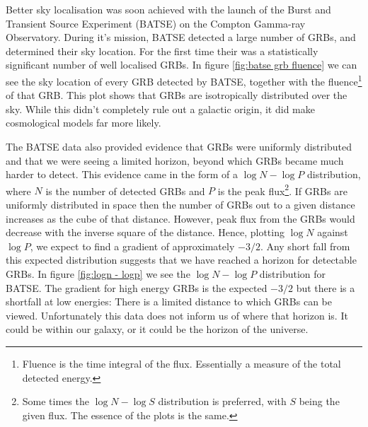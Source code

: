 \documentclass[11pt]{cuthesis}
\begin{document}
Better sky localisation was soon achieved with the launch of the Burst and Transient Source Experiment (BATSE) on the Compton Gamma-ray Observatory. During it's mission, BATSE detected a large number of GRBs, and determined their sky location. For the first time their was a statistically significant number of well localised GRBs. In figure \ref{fig:batse grb fluence} we can see the sky location of every GRB detected by BATSE, together with the fluence\footnote{Fluence is the time integral of the flux. Essentially a measure of the total detected energy.} of that GRB. This plot shows that GRBs are isotropically distributed over the sky. While this didn't completely rule out a galactic origin, it did make cosmological models far more likely. 

The BATSE data also provided evidence that GRBs were uniformly distributed and that we were seeing a limited horizon, beyond which GRBs became much harder to detect. This evidence came in the form of a $\log N - \log P$ distribution, where $N$ is the number of detected GRBs and $P$ is the peak flux\footnote{Some times the $\log N - \log S$ distribution is preferred, with $S$ being the given flux. The essence of the plots is the same.}. If GRBs are uniformly distributed in space then the number of GRBs out to a given distance increases as the cube of that distance. However, peak flux from the GRBs would decrease with the inverse square of the distance. Hence, plotting  $\log N$ against $\log P$, we expect to find a gradient of approximately $-3/2$. Any short fall from this expected distribution suggests that we have reached a horizon for detectable GRBs. In figure \ref{fig:logn - logp} we see the $\log N - \log P$ distribution for BATSE. The gradient for high energy GRBs is the expected $-3/2$ but there is a shortfall at low energies: There is a limited distance to which GRBs can be viewed. Unfortunately this data does not inform us of where that horizon is. It could be within our galaxy, or it could be the horizon of the universe.   
\end{document}

